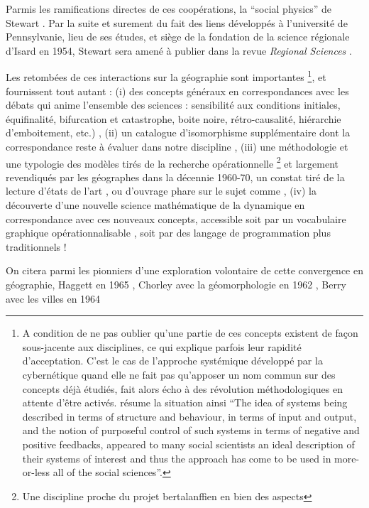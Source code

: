 Parmis les ramifications directes de ces coopérations, la \enquote{social physics} de Stewart \autocite{Stewart1947}. Par la suite et surement du fait des liens développés à l'université de Pennsylvanie, lieu de ses études, et siège de la fondation de la science régionale d'Isard en 1954, Stewart sera amené à publier dans la revue \textit{Regional Sciences} \autocite{Stewart1958}.

Les retombées de ces interactions sur la géographie sont importantes \footnote{ A condition de ne pas oublier qu'une partie de ces concepts existent de façon sous-jacente aux disciplines, ce qui explique parfois leur rapidité d'acceptation. C'est le cas de l'approche systémique développé par la cybernétique quand elle ne fait pas qu'apposer un nom commun sur des concepts déjà étudiés, fait alors écho à des révolution méthodologiques en attente d'être activés. \textcite[5]{Batty1976} résume la situation ainsi \foreignquote{english}{The idea of systems being described in terms of structure and behaviour, in terms of input and output, and the notion of purposeful control of such systems in terms of negative and positive feedbacks, appeared to many social scientists an ideal description of their systems of interest and thus the approach has come to be used in more-or-less all of the social sciences}.}, et fournissent tout autant : (i) des concepts généraux en correspondances avec les débats qui anime l'ensemble des sciences : sensibilité aux conditions initiales, équifinalité, bifurcation et catastrophe, boite noire, rétro-causalité, hiérarchie d'emboitement, etc.) , (ii) un catalogue d'isomorphisme supplémentaire dont la correspondance reste à évaluer dans notre discipline \autocite{Wilson1969}, (iii)  une méthodologie et une typologie des modèles tirés de la recherche opérationnelle \autocite{Ackoff1962} \footnote{Une discipline proche du projet bertalanffien en bien des aspects} et largement revendiqués par les géographes dans la décennie 1960-70, un constat tiré de la lecture  d'états de l'art \autocite{Kohn1970}, ou d'ouvrage phare sur le sujet comme \autocite{Berry1964, Haggett1965}, (iv) la découverte d'une nouvelle science mathématique de la dynamique en correspondance avec ces nouveaux concepts, accessible soit par un vocabulaire graphique opérationnalisable \autocite{Forrester1961}, soit par des langage de programmation plus traditionnels !

On citera parmi les pionniers d'une exploration volontaire de cette convergence en géographie, Haggett en 1965 \autocite{Haggett1965}, Chorley avec la géomorphologie en 1962 \autocite{Chorley1962}, Berry avec les villes en 1964 \autocite{Berry1964}

